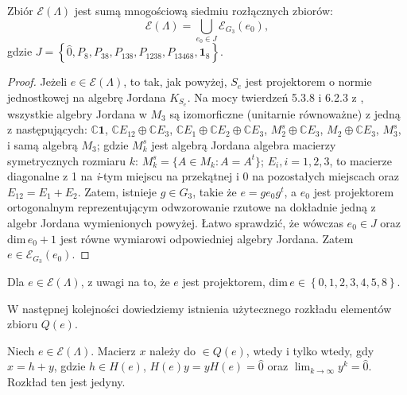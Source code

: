 {\begin{Theorem}
\label{thm:Idempotents}
Zbiór $\mathcal{E}(\Lambda)$
jest sumą mnogościową siedmiu rozłącznych zbiorów:
    \begin{equation}
        \mathcal{E}(\Lambda) = \bigcup \limits_{e_{0} \in J} \mathcal{E}_{G_{3}}(e_{0}),
    \end{equation}
    gdzie $J = \left \{ \hat{0}, P_{8}, P_{38}, P_{138}, P_{1238}, P_{13468}, \mathbf{1}_{8} \right \}$.
\end{Theorem}
\begin{proof}
Jeżeli $e \in \mathcal{E}(\Lambda)$, to tak, jak powyżej, $S_{e}$
jest projektorem o normie jednostkowej na algebrę Jordana $K_{S_{e}}$.
Na mocy twierdzeń 5.3.8 i 6.2.3 z \cite{Hanche1984},
wszystkie algebry Jordana w $M_{3}$ są izomorficzne (unitarnie równoważne) z
jedną z następujących:
    $\mathbb{C}\mathbf{1}$,
    $\mathbb{C} E_{12} \oplus \mathbb{C} E_{3}$,
    $\mathbb{C} E_{1} \oplus \mathbb{C} E_{2} \oplus \mathbb{C} E_{3}$,
    $M_{2}^{s} \oplus \mathbb{C} E_{3}$,
    $M_{2} \oplus \mathbb{C} E_{3}$,
    $M_{3}^{s}$,
    i
    samą algebrą $M_{3}$;
gdzie $M_{k}^{s}$ jest algebrą Jordana algebra macierzy symetrycznych rozmiaru
$k$: $M_{k}^{s} = \{ A \in M_{k}: A = A^{t} \}$;
    $E_{i}, i = 1,2,3$, to macierze diagonalne z 1 na \emph{i}-tym miejscu na
    przekątnej i 0 na pozostałych miejscach oraz $E_{12} = E_{1} + E_{2}$.
Zatem, istnieje $g \in G_{3}$, takie że
    $e = g e_{0} g ^{t}$, a $e_{0}$ jest projektorem ortogonalnym
    reprezentującym odwzorowanie rzutowe na dokładnie jedną z algebr Jordana
    wymienionych powyżej.
Łatwo sprawdzić, że wówczas $e_{0} \in J$ oraz
$\text{dim} \, e_{0} + 1$ jest równe wymiarowi odpowiedniej algebry Jordana.
Zatem $e \in \mathcal{E}_{G_{3}}(e_{0})$.
\end{proof}

\begin{Corollary}
\label{cor:q}
    Dla $e \in \mathcal{E}(\Lambda)$, z uwagi na to, że $e$ jest projektorem,
    $\text{dim} \, e
    \in \left \{ 0,1,2,3,4,5,8 \right \}$.
\end{Corollary}

W następnej kolejności dowiedziemy istnienia użytecznego rozkładu elementów
zbioru $Q(e)$.

\begin{Lemma}
\label{lem:decomposition}
    Niech $e \in \mathcal{E}(\Lambda)$.
    Macierz $x$ należy do $\in Q(e)$, wtedy i tylko wtedy, gdy
    $x = h + y$, gdzie
    $h \in H(e)$, $H(e) y = y H(e) = \hat{0}$ oraz
    $\lim_{k \rightarrow \infty} y^{k} = \hat{0}$.
    Rozkład ten jest jedyny.
\end{Lemma}

}
